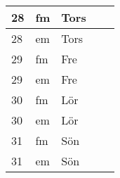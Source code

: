 \documentclass[a4paper]{article}
\begin{document}
\begin{table}[ht!]
\begin{tabular}{lllp{7cm}p{7cm}}
\multicolumn{1}{|l|}{28} & \multicolumn{1}{l|}{fm} & \multicolumn{1}{l|}{Tors} & \multicolumn{1}{l|}{} & \multicolumn{1}{l|}{} \\ \hline
\multicolumn{1}{|l|}{28} & \multicolumn{1}{l|}{em} & \multicolumn{1}{l|}{Tors} & \multicolumn{1}{l|}{} & \multicolumn{1}{l|}{} \\ \hline    

\multicolumn{1}{|l|}{29} & \multicolumn{1}{l|}{fm} & \multicolumn{1}{l|}{Fre} & \multicolumn{1}{l|}{} & \multicolumn{1}{l|}{} \\ \hline
\multicolumn{1}{|l|}{29} & \multicolumn{1}{l|}{em} & \multicolumn{1}{l|}{Fre} & \multicolumn{1}{l|}{} & \multicolumn{1}{l|}{} \\ \hline    

\multicolumn{1}{|l|}{30} & \multicolumn{1}{l|}{fm} & \multicolumn{1}{l|}{Lör} & \multicolumn{1}{l|}{} & \multicolumn{1}{l|}{} \\ \hline
\multicolumn{1}{|l|}{30} & \multicolumn{1}{l|}{em} & \multicolumn{1}{l|}{Lör} & \multicolumn{1}{l|}{} & \multicolumn{1}{l|}{} \\ \hline    

\multicolumn{1}{|l|}{31} & \multicolumn{1}{l|}{fm} & \multicolumn{1}{l|}{Sön} & \multicolumn{1}{l|}{} & \multicolumn{1}{l|}{} \\ \hline
\multicolumn{1}{|l|}{31} & \multicolumn{1}{l|}{em} & \multicolumn{1}{l|}{Sön} & \multicolumn{1}{l|}{} & \multicolumn{1}{l|}{} \\ \hline    

    \end{tabular}
    \end{table}
    
\end{document}
